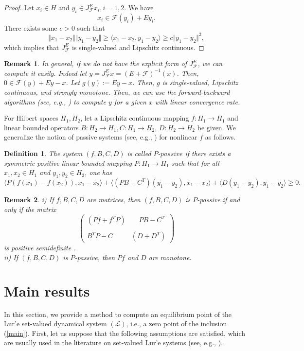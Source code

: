 \documentclass[11pt]{article}
\def\beq{\begin{equation}}
\def\eeq{\end{equation}}
\theoremstyle{plain}
\newtheorem{definition}{Definition}
\newtheorem{remark}{Remark}
\begin{document}
{\begin{proof}
Let $x_i\in H$ and $y_i\in J^E_\mathcal{F}x_i, i=1, 2$. We have 
$$
x_i\in \mathcal{F}(y_i)+Ey_i.
$$
There exists some $c>0$ such that
$$
\Vert x_1-x_2 \Vert \Vert y_1-y_2  \Vert \ge \langle x_1-x_2, y_1-y_2 \rangle\ge c \Vert y_1-y_2\Vert^2,
$$
which implies that $J^E_\mathcal{F}$ is single-valued and Lipschitz continuous.
\end{proof}
\begin{remark}
In general, if we do not have the explicit form of $J^E_\mathcal{F}$, we can compute it easily. Indeed let $y=J^E_\mathcal{F}x=(E+\mathcal{F})^{-1}(x)$. Then, $0\in \mathcal{F}(y)+Ey-x$. Let $g(y):=Ey-x$. Then, $g$ is single-valued, Lipschitz continuous, and strongly monotone. Then, we can use the forward-backward algorithms (see, e.g., \cite{Tseng}) to compute $y$ for a given $x$ with linear convergence rate.  
\end{remark}

{{For Hilbert spaces $H_1,H_2$, let}} a Lipschitz continuous mapping $f: {H_1\to H_1}$ and linear bounded operators $B:{H_2\to H_1}, C: {H_1\to H_2} $, $D: {H_2\to H_2}$ be given. We generalize the notion of passive systems  (see, e.g., \cite{blme}) for nonlinear $f$ as follows.
\begin{definition} \label{passi} The system $(f,B,C,D)$ is called $P$-$passive$ if there exists a symmetric positive linear bounded mapping $P: {H_1\to H_1}$ such that  for all $x_1,x_2\in H_1$ and  $y_1,y_2\in H_2$, one has
\beq\label{passi}
\langle P(f(x_1)-f(x_2)), x_1-x_2 \rangle+ \langle (PB-C^T) (y_1-y_2), x_1-x_2 \rangle+ \langle D(y_1-y_2),y_1-y_2 \rangle \ge 0.
\eeq
\end{definition}
\begin{remark}
i) If $f, B, C, D$ are  matrices, then $(f,B,C,D)$ is $P$-passive if and only if  the matrix 
$$\left( \begin{array}{cc}
 (Pf+f^TP)& \;\;\;\;PB-C^T\\ \\
B^TP-C & (D+D^T)
\end{array} \right)$$
is positive semidefinite  \cite{blme}. \\
ii) If $(f,B,C,D)$ is $P$-passive, then $Pf$ and $D$ are monotone. 
\end{remark}


\section{Main results}\label{sec3}

  In this section, we provide a method to compute an equilibrium point of the Lur'e set-valued dynamical system $({\mathcal L})$, i.e., a {{zero point}}  of the inclusion  (\ref{main}). First, let us suppose that the following assumptions  are satisfied, which are usually used in the literature on set-valued Lur'e systems (see, e.g., \cite{ahl,bg2,bh,BT,cs,L1,tbc}).\\

}
\end{document}

